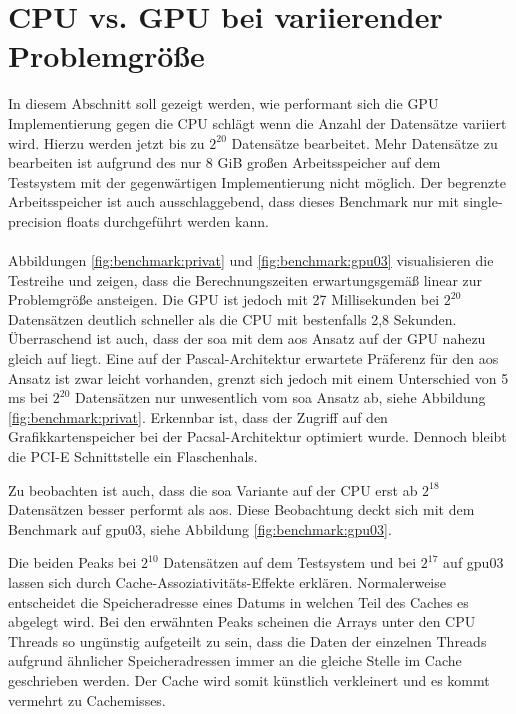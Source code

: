 \section{CPU vs. GPU bei variierender Problemgröße}
In diesem Abschnitt soll gezeigt werden, wie performant sich die GPU Implementierung gegen die CPU schlägt wenn die Anzahl der Datensätze variiert wird. Hierzu werden jetzt bis zu $2^{20}$ Datensätze bearbeitet.
Mehr Datensätze zu bearbeiten ist aufgrund des nur 8 GiB großen Arbeitsspeicher auf dem Testsystem mit der gegenwärtigen Implementierung nicht möglich. Der begrenzte Arbeitsspeicher ist auch ausschlaggebend, dass dieses Benchmark nur mit single-precision floats durchgeführt werden kann.
\\\\
Abbildungen \ref{fig:benchmark:privat} und \ref{fig:benchmark:gpu03} visualisieren die Testreihe und zeigen, dass die Berechnungszeiten erwartungsgemäß linear zur Problemgröße ansteigen. Die GPU ist jedoch mit 27 Millisekunden bei $2^{20}$ Datensätzen deutlich schneller als die CPU mit bestenfalls 2,8 Sekunden. Überraschend ist auch, dass der \gls{soa} mit dem \gls{aos} Ansatz auf der GPU nahezu gleich auf liegt. Eine auf der Pascal-Architektur erwartete Präferenz für den \gls{aos} Ansatz ist zwar leicht vorhanden, grenzt sich jedoch mit einem Unterschied von 5 ms bei $2^{20}$ Datensätzen nur unwesentlich vom \gls{soa} Ansatz ab, siehe Abbildung \ref{fig:benchmark:privat}.
Erkennbar ist, dass der Zugriff auf den Grafikkartenspeicher bei der Pacsal-Architektur optimiert wurde. Dennoch bleibt die PCI-E Schnittstelle ein Flaschenhals.

Zu beobachten ist auch, dass die \gls{soa} Variante auf der CPU erst ab $2^{18}$ Datensätzen besser performt als \gls{aos}. Diese Beobachtung deckt sich mit dem Benchmark auf gpu03, siehe Abbildung \ref{fig:benchmark:gpu03}.

Die beiden Peaks bei $2^{10}$ Datensätzen auf dem Testsystem und bei $2^{17}$ auf gpu03 lassen sich durch Cache-Assoziativitäts-Effekte erklären. Normalerweise entscheidet die Speicheradresse eines Datums in welchen Teil des Caches es abgelegt wird. Bei den erwähnten Peaks scheinen die Arrays unter den CPU Threads so ungünstig aufgeteilt zu sein, dass die Daten der einzelnen Threads aufgrund ähnlicher Speicheradressen immer an die gleiche Stelle im Cache geschrieben werden. Der Cache wird somit künstlich verkleinert und es kommt vermehrt zu Cachemisses.




